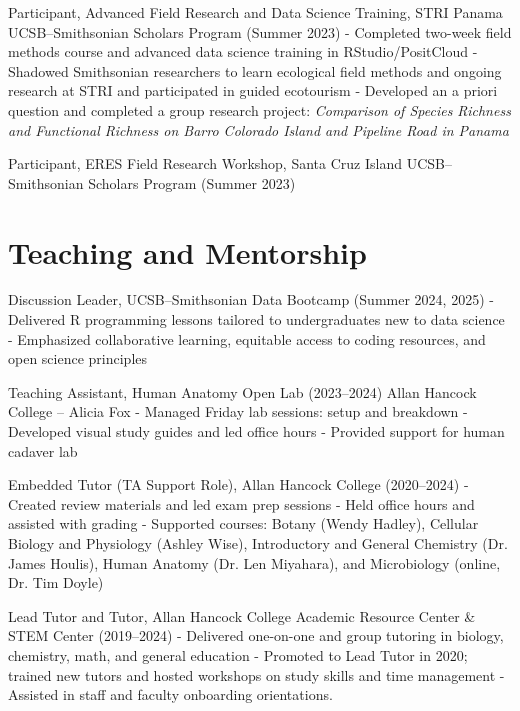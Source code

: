 \documentclass[letterpaper]{article}
\newenvironment{biblist}{%
   \begin{list}{}{%
     \setlength{\labelwidth}{0pt}%
     \setlength{\labelsep}{1em}%
     \setlength{\leftmargin}{2em}%
     \setlength{\itemindent}{-1em}%
   }
}{\end{list}}
\begin{document}
\begin{biblist}
\item Participant, Advanced Field Research and Data Science Training, STRI Panama  
UCSB–Smithsonian Scholars Program (Summer 2023)  
- Completed two-week field methods course and advanced data science training in RStudio/PositCloud  
- Shadowed Smithsonian researchers to learn ecological field methods and ongoing research at STRI and participated in guided ecotourism
- Developed an a priori question and completed a group research project: \textit{Comparison of Species Richness and Functional Richness on Barro Colorado Island and Pipeline Road in Panama}

\item Participant, ERES Field Research Workshop, Santa Cruz Island  
UCSB–Smithsonian Scholars Program (Summer 2023)
\end{biblist}


\section*{Teaching and Mentorship}

\begin{biblist}

\item Discussion Leader, UCSB–Smithsonian Data Bootcamp (Summer 2024, 2025)  
- Delivered R programming lessons tailored to undergraduates new to data science
- Emphasized collaborative learning, equitable access to coding resources, and open science principles


\item Teaching Assistant, Human Anatomy Open Lab (2023–2024)  
Allan Hancock College – Alicia Fox  
- Managed Friday lab sessions: setup and breakdown  
- Developed visual study guides and led office hours  
- Provided support for human cadaver lab  
\item Embedded Tutor (TA Support Role), Allan Hancock College (2020--2024)  
- Created review materials and led exam prep sessions  
- Held office hours and assisted with grading  
- Supported courses: Botany (Wendy Hadley), Cellular Biology and Physiology (Ashley Wise), Introductory and General Chemistry (Dr. James Houlis), Human Anatomy (Dr. Len Miyahara), and Microbiology (online, Dr. Tim Doyle)

\item Lead Tutor and Tutor, Allan Hancock College Academic Resource Center \& STEM Center (2019–2024)  
- Delivered one-on-one and group tutoring in biology, chemistry, math, and general education  
- Promoted to Lead Tutor in 2020; trained new tutors and hosted workshops on study skills and time management
- Assisted in staff and faculty onboarding orientations.

\end{biblist}
\end{document}
